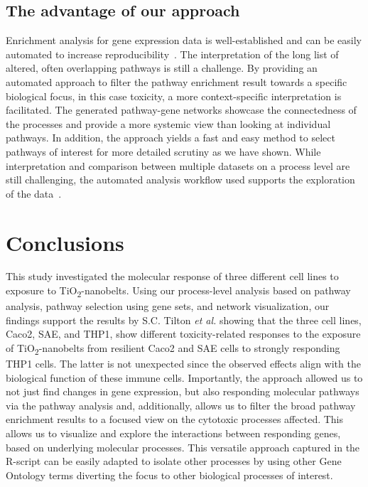 \documentclass[ijms,article,submit,moreauthors,pdftex]{Definitions/mdpi}
\begin{document}
\subsection*{The advantage of our approach}
Enrichment analysis for gene expression data is well-established and can be easily automated to increase reproducibility~\cite{Yu2012}. The interpretation of the long list of altered, often overlapping pathways is still a challenge. By providing an automated approach to filter the pathway enrichment result towards a specific biological focus, in this case toxicity, a more context-specific interpretation is facilitated. The generated pathway-gene networks showcase the connectedness of the processes and provide a more systemic view than looking at individual pathways. In addition, the approach yields a fast and easy method to select pathways of interest for more detailed scrutiny as we have shown. While interpretation and comparison between multiple datasets on a process level are still challenging, the automated analysis workflow used supports the exploration of the data~\cite{TiO2-scripts}.

\section{Conclusions}

This study investigated the molecular response of three different cell lines to exposure to TiO\textsubscript{2}-nanobelts. Using our process-level analysis based on pathway analysis, pathway selection using gene sets, and network visualization, our findings support the results by S.C. Tilton \textit{et al.} showing that the three cell lines, Caco2, SAE, and THP1, show different toxicity-related responses to the exposure of TiO\textsubscript{2}-nanobelts from resilient Caco2 and SAE cells to strongly responding THP1 cells. The latter is not unexpected since the observed effects align with the biological function of these immune cells. Importantly, the approach allowed us to not just find changes in gene expression, but also responding molecular pathways via the pathway analysis and, additionally, allows us to filter the broad pathway enrichment results to a focused view on the cytotoxic processes affected. This allows us to visualize and explore the interactions between responding genes, based on underlying molecular processes. This versatile approach captured in the R-script can be easily adapted to isolate other processes by using other Gene Ontology terms diverting the focus to other biological processes of interest.
\end{document}

